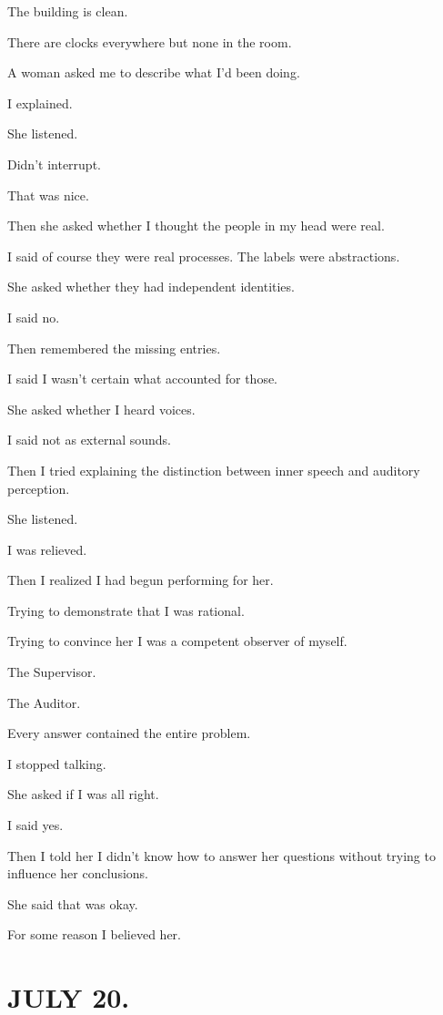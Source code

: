 \documentclass[11pt,oneside]{book}
\begin{document}
The building is clean.

There are clocks everywhere but none in the room.

A woman asked me to describe what I'd been doing.

I explained.

She listened.

Didn't interrupt.

That was nice.

Then she asked whether I thought the people in my head were real.

I said of course they were real processes. The labels were abstractions.

She asked whether they had independent identities.

I said no.

Then remembered the missing entries.

I said I wasn't certain what accounted for those.

She asked whether I heard voices.

I said not as external sounds.

Then I tried explaining the distinction between inner speech and auditory perception.

She listened.

I was relieved.

Then I realized I had begun performing for her.

Trying to demonstrate that I was rational.

Trying to convince her I was a competent observer of myself.

The Supervisor.

The Auditor.

Every answer contained the entire problem.

I stopped talking.

She asked if I was all right.

I said yes.

Then I told her I didn't know how to answer her questions without trying to influence her conclusions.

She said that was okay.

For some reason I believed her.

\section*{JULY 20.}
\end{document}
